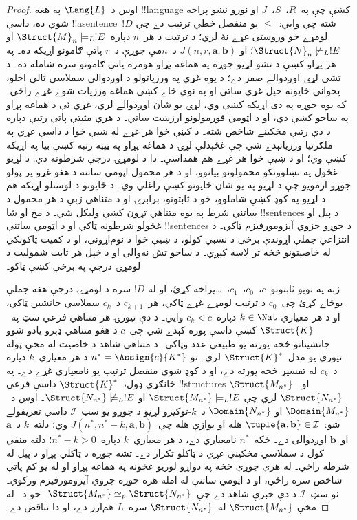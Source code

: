 \documentclass[../../../include/open-logic-section]{subfiles}
\begin{document}
\begin{proof}
اوس د~$\Lang{L}$ په هغه !!{language} کښې چې په~$R$،~$S$،~$J$ او
نورو نښو پراخه شوې ده، داسې !!a{sentence}~$!D$ شته چې وايي:~$\le$
يو منفصل خطي ترتيب دے چې لومړے خو وروستی غړے نۀ لري؛ د ترتيب
د هر~$n$ دپاره~$\Struct{M}_n \models_L !E$ او
$\Struct{N}_n \not\models_L !E$؛ او
$J(n,r,\mathbf{a},\mathbf{b})$ د~$n$مې جوړې د~$r$ پاتې ګامونو اړيکه ده۔ په هر پړاو کښې د تشو لړيو جوړه په هماغه پړاو هومره پاتې ګامونو سره شامله ده۔ د تشې لړۍ اوږدوالے صفر دے؛ د يوه غړي په ورزياتولو د اوږدوالي سملاسي تالي اخلو، پخواني ځايونه خپل غړي ساتي او په نوي ځاے کښې هماغه ورزيات شوے غړے راځي۔ که يوه جوړه په دې اړيکه کښې وي، لړۍ يو شان اوږدوالے لري، غړي ئې د هماغه پړاو په ساحو کښې دي، او د اټومي فورمولونو ارزښت ساتي۔ د هرې مثبتې پاتې رتبې دپاره د دې رتبې مخکينے شاخص شته۔ د کيڼې خوا هر غړے له ښيې خوا د داسې غړي په ملګرتيا ورزياتېدے شي چې غځېدلې لړۍ د هماغه پړاو په ټيټه رتبه کښې بيا په اړيکه کښې وي؛ او د ښيې خوا هر غړے هم همداسې۔ دا د لومړۍ درجې شرطونه دي: د لړيو غځول په نښلوونکو محمولونو بيانوو، او د هر محمول اټومي ساتنه د هغو غړو پر ټولو جوړو ازمويو چې د لړيو په يو شان ځايونو کښې راغلي وي۔ د ځايونو د لوستلو اړيکه هم د لړيو په کوډ کښې شاملوو، څو د ثابتونو، برابرۍ او د متناهي ژبې د هر محمول د ساتنې شرط په يوه متناهي تړون کښې وليکل شي۔ د مخ او شا !!{sentence}s د پيل او غځولو شرطونه ټاکي او د اټومي ساتنې !!{sentence}s د جوړو جزوي آيزومورفيزم ټاکي۔ د انتزاعي جملې اړوندې برخې د نسبي کولو، د ښيې خوا د نوم‌اړونې، او د کميت ټاکونکي له خاصيتونو څخه تر لاسه کېږي۔ د ساحو تش نه‌والی او د خپل هر ثابت شموليت د لومړۍ درجې په برخې کښې ټاکو۔

ژبه په نويو ثابتونو~$c$،~$c_0$،~$c_1$،~\dots پراخه کړئ، او له
$!D$ سره د لومړۍ درجې هغه جملې يوځاے کړئ چې~$c_0$ د ترتيب لومړے
غړے ټاکي، هر~$c_{k+1}$ د~$c_k$ سملاسي جانشين ټاکي، او د هر معياري
$k \in \Nat$ دپاره~$c_k < c$ وايي۔ د دې تيورۍ هر متناهي فرعي سټ
په~$\Struct{K}$ کښې داسې پوره کېدے شي چې~$c$ د هغو متناهي ډېرو
يادو شوو جانشينانو څخه پورته يو طبيعي عدد وټاکي۔ د متناهي شاهد د
خاصيت له مخې ټوله تيوري يو مدل~$\Struct{K}^*$ لري۔ نو
$n^* = \Assign{c}{K^*}$ د هر معياري~$k$ دپاره د~$c_k$ له تفسير څخه
پورته دے، او د کوډ شوي منفصل ترتيب يو نامعياري غړے دے۔ په
ځانګړي ډول،~$\Struct{K}^*$ داسې فرعي !!{structure}s
$\Struct{M_{n^*}}$ او~$\Struct{N_{n^*}}$ لري چې
$\Struct{M_{n^*}} \models_L !E$ او
$\Struct{N_{n^*}} \not\models_L !E$۔ اوس د~$\Domain{M_{n^*}}$ او
$\Domain{N_{n^*}}$ د~$k$-توکيزو لړيو د جوړو يو سټ~$\mathcal{I}$
داسې تعريفولے شو:~$\tuple{\mathbf{a}, \mathbf{b}} \in \mathcal{I}$
هله او يوازې هله چې~$J(n^*,n^*-k,\mathbf{a},\mathbf{b})$ وي؛ دلته~$k$
د~$\mathbf{a}$ او~$\mathbf{b}$ اوږدوالی دے۔ ځکه~$n^*$ نامعياري
دے، د هر معياري~$k$ دپاره~$n^* - k >0$؛ دلته منفي کول د سملاسي مخکيني غړي د ټاکلو تکرار دے۔ تشه جوړه د ټاکلي پړاو د پيل له شرطه راځي۔ له هرې جوړې څخه په دواړو لوريو غځونه په هماغه پړاو او له يو کم پاتې شاخص سره راځي، او د اټومي ساتنې له امله هره جوړه جزوي آيزومورفيزم ورکوي۔ نو سټ~$\mathcal{I}$ د دې
خبرې شاهد دے چې~$\Struct{M_{n^*}} \simeq_p
\Struct{N_{n^*}}$۔ خو د~ له مخې
$\Struct{M_{n^*}}$ له~$\Struct{N_{n^*}}$ سره~$L$-هم‌ارز دے، او دا
تناقض دے۔
\end{proof}
\end{document}

